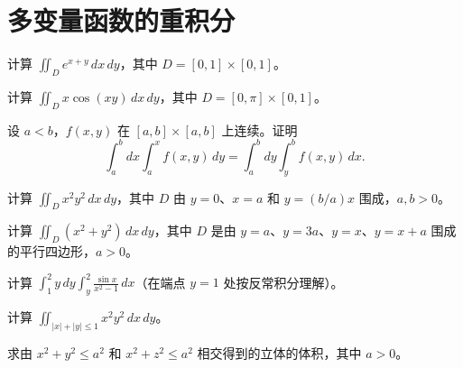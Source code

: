 \renewcommand{\thesection}{\arabic{section}}\renewcommand{\theHsection}{chapter.\arabic{section}}\setcounter{section}{9}\section{多变量函数的重积分}
\noindent\begin{minipage}{\textwidth}
计算 $\displaystyle\iint_D e^{x+y}\,dx\,dy$，其中 $D=[0,1]\times[0,1]$。
\end{minipage}\par\vfill
\noindent\begin{minipage}{\textwidth}
计算 $\displaystyle\iint_D x\cos(xy)\,dx\,dy$，其中 $D=[0,\pi]\times[0,1]$。
\end{minipage}\par\vfill
\noindent\begin{minipage}{\textwidth}
设 $a<b$，$f(x,y)$ 在 $[a,b]\times[a,b]$ 上连续。证明\[\int_a^b dx\int_a^x f(x,y)\,dy=\int_a^b dy\int_y^b f(x,y)\,dx.\]
\end{minipage}\par\vfill
\noindent\begin{minipage}{\textwidth}
计算 $\displaystyle\iint_D x^2y^2\,dx\,dy$，其中 $D$ 由 $y=0$、$x=a$ 和 $y=(b/a)x$ 围成，$a,b>0$。
\end{minipage}\par\vfill
\newpage
\noindent\begin{minipage}{\textwidth}
计算 $\displaystyle\iint_D(x^2+y^2)\,dx\,dy$，其中 $D$ 是由 $y=a$、$y=3a$、$y=x$、$y=x+a$ 围成的平行四边形，$a>0$。
\end{minipage}\par\vfill
\noindent\begin{minipage}{\textwidth}
计算 $\displaystyle\int_1^2 y\,dy\int_y^2\frac{\sin x}{x^2-1}\,dx$（在端点 $y=1$ 处按反常积分理解）。
\end{minipage}\par\vfill
\noindent\begin{minipage}{\textwidth}
计算 $\displaystyle\iint_{|x|+|y|\le1}x^2y^2\,dx\,dy$。
\end{minipage}\par\vfill
\noindent\begin{minipage}{\textwidth}
求由 $x^2+y^2\le a^2$ 和 $x^2+z^2\le a^2$ 相交得到的立体的体积，其中 $a>0$。
\end{minipage}\par\vfill
